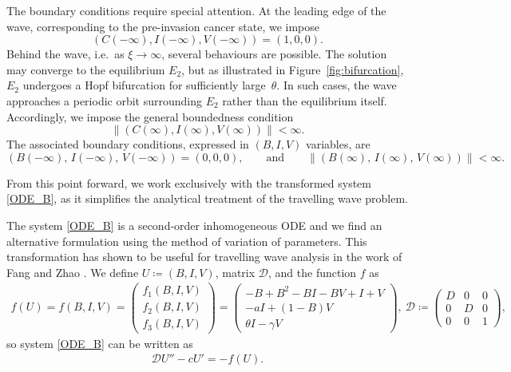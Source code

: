 \documentclass[11pt]{article}
\theoremstyle{definition}
\begin{document}
The boundary conditions require special attention. At the leading edge of the wave, corresponding to the pre-invasion cancer state, we impose
\[
(C(-\infty), I(-\infty), V(-\infty)) = (1,0,0).
\]
Behind the wave, i.e.\ as $\xi \to \infty$, several behaviours are possible. The solution may converge to the equilibrium $E_2$, but as illustrated in Figure~\ref{fig:bifurcation}, $E_2$ undergoes a Hopf bifurcation for sufficiently large~$\theta$. In such cases,  the wave approaches a periodic orbit surrounding $E_2$ rather than the equilibrium itself. Accordingly, we impose the general boundedness condition
\[
\|(C(\infty), I(\infty), V(\infty))\| < \infty.
\]
The associated boundary conditions, expressed in $(B,I,V)$ variables, are
\begin{equation}\label{boundarycondition}
(B(-\infty),\, I(-\infty),\, V(-\infty)) = (0,0,0),
\qquad \text{and} \qquad
\bigl\|(B(\infty),\, I(\infty),\, V(\infty))\bigr\| < \infty.
\end{equation}


From this point forward, we work exclusively with the transformed system \eqref{ODE_B}, as it simplifies the analytical treatment of the travelling wave problem.

 The system \eqref{ODE_B} is a second-order inhomogeneous ODE and we find an alternative formulation using the method of variation of parameters. This transformation has shown to be useful for travelling wave analysis in the work of Fang and Zhao \cite{FangJian2009MWfP}. We define $U\coloneqq(B,I,V)$, matrix $\mathcal{D}$, and the function $f$ as  \begin{align}\label{f_equation}f(U)= f(B,I,V)=\begin{pmatrix}
    f_1(B,I,V)\\  f_2(B,I,V)\\  f_3(B,I,V)
\end{pmatrix}= \begin{pmatrix}
    -B+B^2-BI-BV+I+V\\ -a I+(1-B)V\\ \theta I-\gamma V
\end{pmatrix}, \ \mathcal{D}\coloneqq\begin{pmatrix}
    D &0&0\\ 0& D&0 \\ 0&0& 1 
\end{pmatrix}, \end{align} 
so system \eqref{ODE_B} can be written as  
\begin{align} \label{eq:short1}
    \mathcal{D}U''-cU'=-f(U).\end{align}
    
\end{document}
